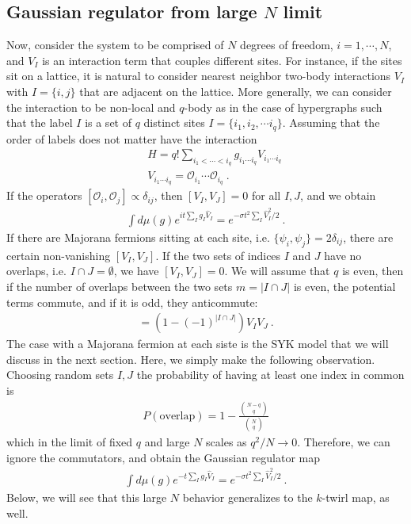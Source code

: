 \documentclass{article}
\theoremstyle{definition}
\newcommand{\nn}{\nonumber}
\begin{document}
    \subsection{Gaussian regulator from large $N$ limit}

    Now, consider the system to be comprised of $N$ degrees of freedom, $i=1,\cdots
    , N$, and $V_{I}$ is an interaction term that couples different sites. For instance,
    if the sites sit on a lattice, it is natural to consider nearest neighbor two-body
    interactions $V_{I}$ with $I=\{i,j\}$ that are adjacent on the lattice. More
    generally, we can consider the interaction to be non-local and $q$-body as in
    the case of hypergraphs such that the label $I$ is a set of $q$ distinct sites
    $I=\{i_{1},i_{2},\cdots i_{q}\}$. Assuming that the order of labels does not
    matter have the interaction
    \begin{eqnarray}
        &&H=q!\sum_{i_1<\cdots <i_q}g_{i_1\cdots i_q} V_{i_1\cdots i_q}\nn\\
        &&V_{i_1\cdots i_q}=\mathcal{O}_{i_1}\cdots \mathcal{O}_{i_q}\ .
    \end{eqnarray}
    If the operators $[\mathcal{O}_{i},\mathcal{O}_{j}]\propto \delta_{ij}$, then
    $[V_{I},V_{J}]=0$ for all $I,J$, and we obtain
    \begin{eqnarray}
        \int d\mu(g)e^{i t \sum_I g_I \hat{V}_I}=e^{-\sigma t^2\sum_I \hat{V}_I^2/2}\ .
    \end{eqnarray}
    If there are Majorana fermions sitting at each site, i.e.
    $\{\psi_{i},\psi_{j}\}=2\delta_{ij}$, there are certain non-vanishing $[V_{I}
    ,V_{J}]$. If the two sets of indices $I$ and $J$ have no overlaps, i.e.
    $I\cap J=\emptyset$, we have $[V_{I},V_{J}]=0$. We will assume that $q$ is
    even, then if the number of overlaps between the two sets $m=|I\cap J|$ is even,
    the potential terms commute, and if it is odd, they anticommute:
    \begin{eqnarray}
        [V_I,V_J]=(1-(-1)^{|I\cap J|})V_IV_J\ .
    \end{eqnarray}
    The case with a Majorana fermion at each siste is the SYK model that we will
    discuss in the next section. Here, we simply make the following observation.
    Choosing random sets $I,J$ the probability of having at least one index in
    common is
    \begin{eqnarray}
        P(\text{overlap})=1-\frac{{N-q\choose q}}{{N \choose q}}
    \end{eqnarray}
    which in the limit of fixed $q$ and large $N$ scales as $q^{2}/N\to 0$. Therefore,
    we can ignore the commutators, and obtain the Gaussian regulator map
    \begin{eqnarray}
        \int d\mu(g) e^{-t\sum_I g_I \hat{V}_I}=e^{-\sigma t^2\sum_I \hat{V}_I^2/2}\ .
    \end{eqnarray}
    Below, we will see that this large $N$ behavior generalizes to the $k$-twirl
    map, as well.
\end{document}
